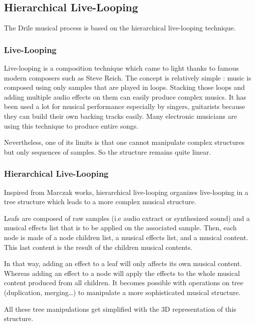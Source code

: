 \subsection{Hierarchical Live-Looping}
The Drile musical process is based on the hierarchical live-looping technique.

\subsubsection{Live-Looping}
Live-looping is a composition technique which came to light thanks to famous modern composers such as Steve Reich.
The concept is relatively simple : music  is composed using only samples that are played in loops. Stacking those loops and adding multiple audio effects on them can easily produce complex musics.
It has been used a lot for musical performance especially by singers, guitarists because they can build their own backing tracks easily. Many electronic musicians are using this technique to produce entire songs.

Nevertheless, one of its limits is that one cannot manipulate complex structures but only sequences of samples. So the structure remains quite linear.

\subsubsection{Hierarchical Live-Looping}
Inspired from Marczak \cite{marczak2007etude} works, hierarchical live-looping organizes live-looping in a tree structure which leads to a more complex musical structure. 

Leafs are composed of raw samples (i.e audio extract or synthesized sound) and a musical effects list that is to be applied on the associated sample. 
Then, each node is made of a node children list, a musical effects list, and a musical content. 
This last content is the result of the children musical contents.

In that way, adding an effect to a leaf will only affects its own musical content. Whereas adding an effect to a node will apply the effects to the whole musical content produced from all children. It becomes possible with operations on tree (duplication, merging\dots ) to manipulate a more sophisticated musical structure. 

All these tree manipulations get simplified with the 3D representation of this structure.